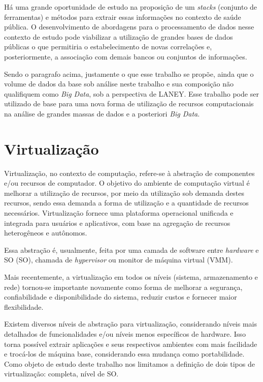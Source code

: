 Há uma grande oportunidade de estudo na proposição de um \emph{stacks} (conjunto de ferramentas) e métodos para extrair essas informações no contexto de saúde pública. O desenvolvimento de abordagens para o processamento de dados nesse contexto de estudo pode viabilizar a utilização de grandes bases de dados públicas o que permitiria o estabelecimento de novas correlações e, posteriormente, a associação com demais bancos ou conjuntos de informações.

Sendo o paragrafo acima, justamente o que esse trabalho se propõe, ainda que o volume de dados da base sob análise neste trabalho e sua composição não qualifiquem como \emph{Big Data}, sob a perspectiva de LANEY. Esse trabalho pode ser utilizado de base para uma nova forma de utilização de recursos computacionais na análise de grandes massas de dados e a posteriori \emph{Big Data}. 

\section{Virtualização}
Virtualização, no contexto de computação, refere-se à abstração de componentes e/ou recursos de computador. O objetivo do ambiente de computação virtual é melhorar a utilização de recursos, por meio da utilização sob demanda destes recursos, sendo essa demanda a forma de utilização e a quantidade de recursos necessários. Virtualização fornece uma plataforma operacional unificada e integrada para usuários e aplicativos, com base na agregação de recursos heterogêneos e autônomos.

Essa abstração é, usualmente, feita por uma camada de software entre \emph{hardware} e SO (SO), chamada de \emph{hypervisor} ou monitor de máquina virtual (VMM).

Mais recentemente, a virtualização em todos os níveis (sistema, armazenamento e rede) tornou-se importante novamente como forma de melhorar a segurança, confiabilidade e disponibilidade do sistema, reduzir custos e fornecer maior flexibilidade.\cite{virt}

Existem diversos níveis de abstração para virtualização, considerando níveis mais detalhados de funcionalidades e/ou níveis menos específicos de hardware. Isso torna possível extrair aplicações e seus respectivos ambientes com mais facilidade e trocá-los de máquina base, considerando essa mudança como portabilidade. Como objeto de estudo deste trabalho nos limitamos a definição de dois tipos de virtualização: completa, nível de SO.

